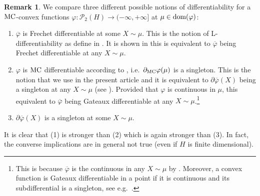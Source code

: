 \documentclass[a4paper]{amsart}
\numberwithin{theorem}{section}
\theoremstyle{definition}
\newtheorem{remark}[theorem]{Remark}
\newcommand{\dom}{\textup{dom}}
\newcommand{\Pc}{\mathcal P}
\renewcommand{\H}{H}
\renewcommand{\phi}{\varphi}
\newcommand{\mc}{\textup{MC}}
\begin{document}
\begin{remark}
We compare three different possible notions of differentiability for a  $\mc$-convex functions $\phi: \Pc_2(\H) \to (-\infty,+\infty] $ at $\mu \in \dom(\phi)$: 
\begin{enumerate}
    \item $\overline{\phi}$ is Frechet differentiable at some $X \sim \mu$. This is the notion of L-differentiability as define in \cite[Defintion~5.22]{CaDe18}. It is shown in \cite[Proposition~5.24] {CaDe18} this is equivalent to $\overline{\phi}$ being Frechet differentiable at any $X \sim \mu$.
    \item $\phi$ is $\mc$ differentiable according to , i.e.\ $\partial_\mc\phi(\mu)$ is a singleton. This is the notion that we use in the present article and it is equivalent to $\partial \overline{\phi}(X)$ being a singleton at any $X \sim \mu$ (see ). Provided that $\phi$ is continuous in $\mu$, this equivalent to $\overline{\phi}$ being Gateaux differentiable at any $X \sim \mu$.\footnote{This is because $\overline{\phi}$ is the continuous in any $X \sim \mu$ by . Moreover, a convex function is Gateaux differentiable in a point if it is continuous and its subdifferential is a singleton, see e.g.\ \cite[Proposition~17.26]{BaCo17}.} 
    \item $\partial \overline{\phi}(X)$ is a singleton at some $X \sim \mu$.
\end{enumerate}
It is clear that (1) is stronger than (2) which is again stronger than (3). In fact, the converse implications are in general not true (even if $\H$ is finite dimensional). 

\end{remark}
\end{document}
